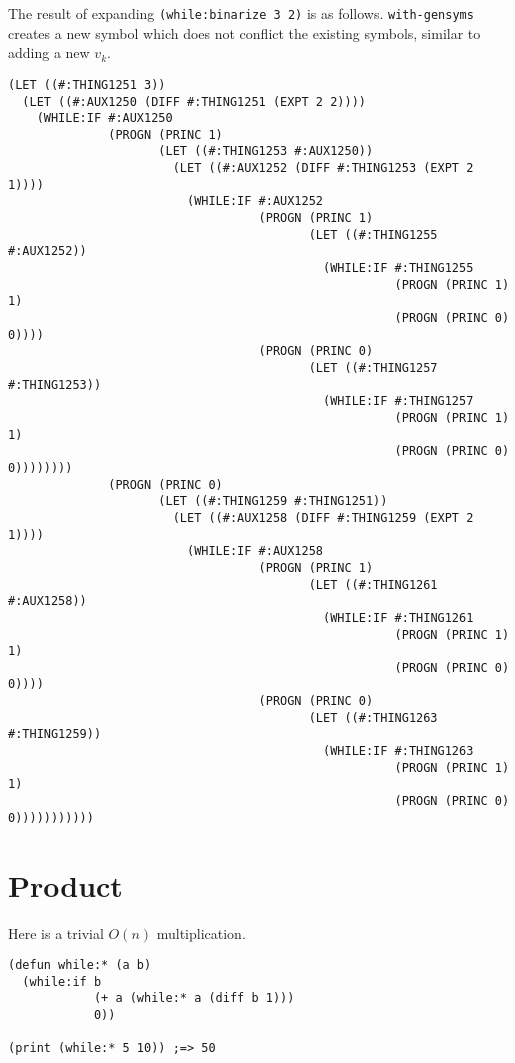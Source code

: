 \documentclass{article}
\begin{document}
The result of expanding \texttt{(while:binarize 3 2)} is as follows. \texttt{with-gensyms}
creates a new symbol which does not conflict the existing symbols, similar to
adding a new $v_k$.

\begin{verbatim}
(LET ((#:THING1251 3))
  (LET ((#:AUX1250 (DIFF #:THING1251 (EXPT 2 2))))
    (WHILE:IF #:AUX1250
              (PROGN (PRINC 1)
                     (LET ((#:THING1253 #:AUX1250))
                       (LET ((#:AUX1252 (DIFF #:THING1253 (EXPT 2 1))))
                         (WHILE:IF #:AUX1252
                                   (PROGN (PRINC 1)
                                          (LET ((#:THING1255 #:AUX1252))
                                            (WHILE:IF #:THING1255
                                                      (PROGN (PRINC 1) 1)
                                                      (PROGN (PRINC 0) 0))))
                                   (PROGN (PRINC 0)
                                          (LET ((#:THING1257 #:THING1253))
                                            (WHILE:IF #:THING1257
                                                      (PROGN (PRINC 1) 1)
                                                      (PROGN (PRINC 0) 0))))))))
              (PROGN (PRINC 0)
                     (LET ((#:THING1259 #:THING1251))
                       (LET ((#:AUX1258 (DIFF #:THING1259 (EXPT 2 1))))
                         (WHILE:IF #:AUX1258
                                   (PROGN (PRINC 1)
                                          (LET ((#:THING1261 #:AUX1258))
                                            (WHILE:IF #:THING1261
                                                      (PROGN (PRINC 1) 1)
                                                      (PROGN (PRINC 0) 0))))
                                   (PROGN (PRINC 0)
                                          (LET ((#:THING1263 #:THING1259))
                                            (WHILE:IF #:THING1263
                                                      (PROGN (PRINC 1) 1)
                                                      (PROGN (PRINC 0) 0)))))))))))
\end{verbatim}

\section{Product}

Here is a trivial $O(n)$ multiplication.

\begin{verbatim}
(defun while:* (a b)
  (while:if b
            (+ a (while:* a (diff b 1)))
            0))

(print (while:* 5 10)) ;=> 50
\end{verbatim}
\end{document}
